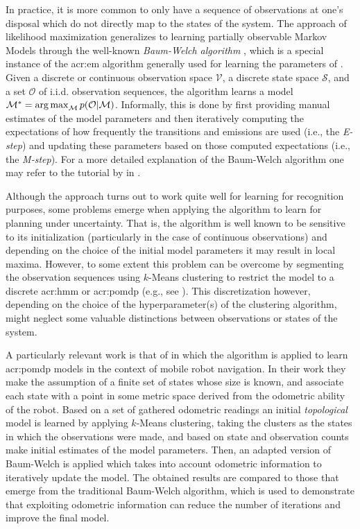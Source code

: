 In practice, it is more common to only have a sequence of observations at one's disposal which do not directly map to the states of the system.
The approach of likelihood maximization generalizes to learning partially observable Markov Models through the well-known \textit{Baum-Welch algorithm} \cite{welch2003hidden}, which is a special instance of the \acrfull{acr:em} algorithm generally used for learning the parameters of .
Given a discrete or continuous observation space $\mathcal{V}$, a discrete state space $\mathcal{S}$, and a set $\mathcal{O}$ of i.i.d. observation sequences, the algorithm learns a model $\mathcal{M}^\ast = \operatorname*{arg\,max}_\mathcal{M} p(\mathcal{O}\vert\mathcal{M})$.
Informally, this is done by first providing manual estimates of the model parameters and then iteratively computing the expectations of how frequently the transitions and emissions are used (i.e., the \textit{E-step}) and updating these parameters based on those computed expectations (i.e., the \textit{M-step}).
For a more detailed explanation of the Baum-Welch algorithm one may refer to the tutorial by \citeauthor{bilmes1998gentle} in \cite{bilmes1998gentle}.

Although the approach turns out to work quite well for learning  for recognition purposes, some problems emerge when applying the algorithm to learn  for planning under uncertainty.
That is, the algorithm is well known to be sensitive to its initialization (particularly in the case of continuous observations) and depending on the choice of the initial model parameters it may result in local maxima.
However, to some extent this problem can be overcome by segmenting the observation sequences using $k$-Means clustering to restrict the model to a discrete \acrshort{acr:hmm} or \acrshort{acr:pomdp} (e.g., see \cite{calinon2007learning}).
This discretization however, depending on the choice of the hyperparameter(s) of the clustering algorithm, might neglect some valuable distinctions between observations or states of the system.

A particularly relevant work is that of \citeauthor{shatkay1997learning} \cite{shatkay1997learning} in which the algorithm is applied to learn \acrshort{acr:pomdp} models in the context of mobile robot navigation.
In their work they make the assumption of a finite set of states whose size is known, and associate each state with a point in some metric space derived from the odometric ability of the robot.
Based on a set of gathered odometric readings an initial \textit{topological} model is learned by applying $k$-Means clustering, taking the clusters as the states in which the observations were made, and based on state and observation counts make initial estimates of the model parameters.
Then, an adapted version of Baum-Welch is applied which takes into account odometric information to iteratively update the model.
The obtained results are compared to those that emerge from the traditional Baum-Welch algorithm, which is used to demonstrate that exploiting odometric information can reduce the number of iterations and improve the final model.

